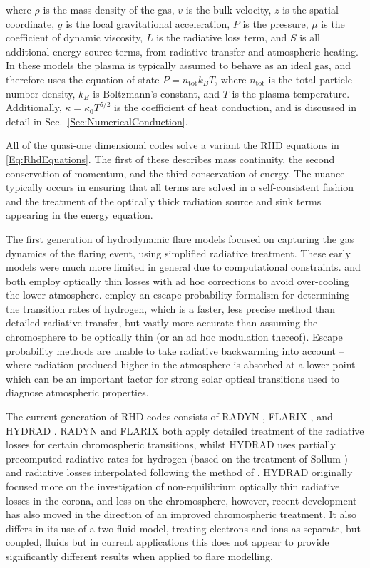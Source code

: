 where $\rho$ is the mass density of the gas, $v$ is the bulk velocity, $z$ is the spatial coordinate, $g$ is the local gravitational acceleration, $P$ is the pressure, $\mu$ is the coefficient of dynamic viscosity, $L$ is the radiative loss term, and $S$ is all additional energy source terms, from radiative transfer and atmospheric heating.
In these models the plasma is typically assumed to behave as an ideal gas, and therefore uses the equation of state
$P = n_{\mathrm{tot}} k_B T$, where $n_{\mathrm{tot}}$ is the total particle number density, $k_B$ is Boltzmann's constant, and $T$ is the plasma temperature. Additionally, $\kappa=\kappa_0 T^{5/2}$ is the coefficient of heat conduction, and is discussed in detail in Sec.~\ref{Sec:NumericalConduction}.

All of the quasi-one dimensional codes solve a variant the RHD equations in \eqref{Eq:RhdEquations}. The first of these describes mass continuity, the second conservation of momentum, and the third conservation of energy.
The nuance typically occurs in ensuring that all terms are solved in a self-consistent fashion and the treatment of the optically thick radiation source and sink terms appearing in the energy equation.

The first generation of hydrodynamic flare models \citet{Nagai1980,Mariska1982,McClymont1983} focused on capturing the gas dynamics of the flaring event, using simplified radiative treatment.
These early models were much more limited in general due to computational constraints. \citet{Nagai1980} and \citet{Mariska1982} both employ optically thin losses with ad hoc corrections to avoid over-cooling the lower atmosphere.
\citet{McClymont1983} employ an escape probability formalism for determining the transition rates of hydrogen, which is a faster, less precise method than detailed radiative transfer, but vastly more accurate than assuming the chromosphere to be optically thin (or an ad hoc modulation thereof).
Escape probability methods are unable to take radiative backwarming into account -- where radiation produced higher in the atmosphere is absorbed at a lower point -- which can be an important factor for strong solar optical transitions used to diagnose atmospheric properties.

The current generation of RHD codes consists of RADYN \citep{Carlsson1992a,Carlsson1995,Carlsson1999, Allred2015}, FLARIX \citep{Varady2010,Heinzel2015}, and HYDRAD \citep{Bradshaw2003, Bradshaw2013}. RADYN and FLARIX both apply detailed treatment of the radiative losses for certain chromospheric transitions, whilst HYDRAD uses partially precomputed radiative rates for hydrogen (based on the treatment of Sollum \NeedRef{}) and radiative losses interpolated following the method of \citet{Carlsson2012}.
HYDRAD originally focused more on the investigation of non-equilibrium optically thin radiative losses in the corona, and less on the chromosphere, however, recent development has also moved in the direction of an improved chromospheric treatment.
It also differs in its use of a two-fluid model, treating electrons and ions as separate, but coupled, fluids but in current applications this does not appear to provide significantly different results when applied to flare modelling.

